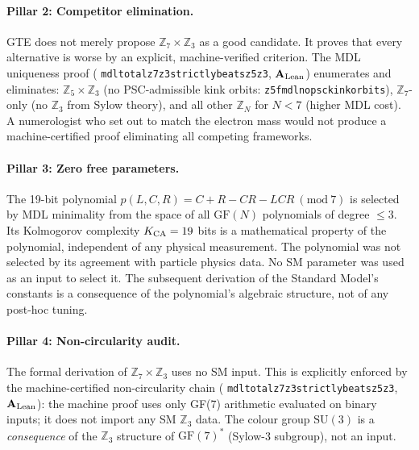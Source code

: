 \documentclass[11pt,openany]{book}
\theoremstyle{remark}
\newcommand{\lean}[1]{%
  \penalty-100
  \begingroup\def\_{\textunderscore\allowbreak}\texttt{#1}\endgroup}
\newcommand{\CatAL}{\ensuremath{\textbf{A}_{\rm Lean}}}
\begin{document}
\paragraph{Pillar 2: Competitor elimination.}
GTE does not merely propose $\mathbb{Z}_7\times\mathbb{Z}_3$ as a good candidate.
It proves that every alternative is worse by an explicit, machine-verified criterion.
The MDL uniqueness proof (\lean{mdl\_total\_z7z3\_strictly\_beats\_z5z3}, \CatAL) enumerates and eliminates:
$\mathbb{Z}_5\times\mathbb{Z}_3$ (no PSC-admissible kink orbits:
\lean{z5\_fmdl\_no\_psc\_kink\_orbits}),
$\mathbb{Z}_7$-only (no $\mathbb{Z}_3$ from Sylow theory), and
all other $\mathbb{Z}_N$ for $N < 7$ (higher MDL cost).
A numerologist who set out to match the electron mass would not produce a machine-certified
proof eliminating all competing frameworks.

\paragraph{Pillar 3: Zero free parameters.}
The 19-bit polynomial $p(L,C,R) = C + R - CR - LCR\ (\text{mod}\ 7)$ is selected by
MDL minimality from the space of all $\mathrm{GF}(N)$ polynomials of degree $\leq 3$.
Its Kolmogorov complexity $K_{\rm CA} = 19$ bits is a mathematical property of the
polynomial, independent of any physical measurement.
The polynomial was not selected by its agreement with particle physics data.
No SM parameter was used as an input to select it.
The subsequent derivation of the Standard Model's constants is a consequence of the
polynomial's algebraic structure, not of any post-hoc tuning.

\paragraph{Pillar 4: Non-circularity audit.}
The formal derivation of $\mathbb{Z}_7\times\mathbb{Z}_3$ uses no SM input.
This is explicitly enforced by the machine-certified non-circularity chain
(\lean{mdl\_total\_z7z3\_strictly\_beats\_z5z3}, \CatAL): the machine proof uses only
GF(7) arithmetic evaluated on binary inputs; it does not import any SM $\mathbb{Z}_3$ data.
The colour group $\mathrm{SU}(3)$ is a \emph{consequence} of the $\mathbb{Z}_3$
structure of $\mathrm{GF}(7)^*$ (Sylow-3 subgroup), not an input.
\end{document}

